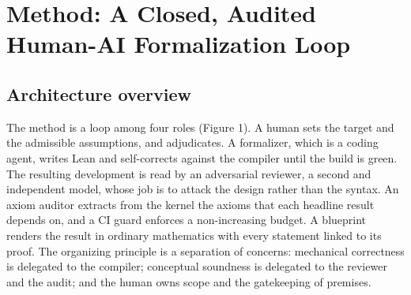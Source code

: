 \documentclass[11pt]{article}
\begin{document}
\section{Method: A Closed, Audited Human-AI Formalization Loop}

\subsection{Architecture overview}

The method is a loop among four roles (Figure 1). A human sets the target and the admissible
assumptions, and adjudicates. A formalizer, which is a coding agent, writes Lean and self-corrects
against the compiler until the build is green. The resulting development is read by an adversarial
reviewer, a second and independent model, whose job is to attack the design rather than the syntax.
An axiom auditor extracts from the kernel the axioms that each headline result depends on, and a CI
guard enforces a non-increasing budget. A blueprint renders the result in ordinary mathematics with
every statement linked to its proof. The organizing principle is a separation of concerns:
mechanical correctness is delegated to the compiler; conceptual soundness is delegated to the
reviewer and the audit; and the human owns scope and the gatekeeping of premises.
\end{document}

